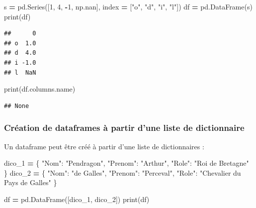 \documentclass[
  12pt,
]{book}
\newenvironment{Shaded}{\begin{snugshade}}{\end{snugshade}}
\newcommand{\BuiltInTok}[1]{#1}
\newcommand{\DecValTok}[1]{\textcolor[rgb]{0.00,0.00,0.81}{#1}}
\newcommand{\NormalTok}[1]{#1}
\newcommand{\OperatorTok}[1]{\textcolor[rgb]{0.81,0.36,0.00}{\textbf{#1}}}
\newcommand{\StringTok}[1]{\textcolor[rgb]{0.31,0.60,0.02}{#1}}
\numberwithin{equation}{section}
\numberwithin{countremarque}{section}
\begin{document}
\begin{Shaded}
\begin{Highlighting}[]
\NormalTok{s }\OperatorTok{=}\NormalTok{ pd.Series([}\DecValTok{1}\NormalTok{, }\DecValTok{4}\NormalTok{, }\OperatorTok{{-}}\DecValTok{1}\NormalTok{, np.nan], index }\OperatorTok{=}\NormalTok{ [}\StringTok{"o"}\NormalTok{, }\StringTok{"d"}\NormalTok{, }\StringTok{"i"}\NormalTok{, }\StringTok{"l"}\NormalTok{])}
\NormalTok{df }\OperatorTok{=}\NormalTok{ pd.DataFrame(s)}
\BuiltInTok{print}\NormalTok{(df)}
\end{Highlighting}
\end{Shaded}

\begin{lstlisting}
##      0
## o  1.0
## d  4.0
## i -1.0
## l  NaN
\end{lstlisting}

\begin{Shaded}
\begin{Highlighting}[]
\BuiltInTok{print}\NormalTok{(df.columns.name)}
\end{Highlighting}
\end{Shaded}

\begin{lstlisting}
## None
\end{lstlisting}

\subsubsection{Création de dataframes à partir d'une liste de dictionnaire}\label{cruxe9ation-de-dataframes-uxe0-partir-dune-liste-de-dictionnaire}

Un dataframe peut être créé à partir d'une liste de dictionnaires :

\begin{Shaded}
\begin{Highlighting}[]
\NormalTok{dico\_1 }\OperatorTok{=}\NormalTok{ \{}
    \StringTok{"Nom"}\NormalTok{: }\StringTok{"Pendragon"}\NormalTok{,}
    \StringTok{"Prenom"}\NormalTok{: }\StringTok{"Arthur"}\NormalTok{,}
    \StringTok{"Role"}\NormalTok{: }\StringTok{"Roi de Bretagne"}
\NormalTok{\}}
\NormalTok{dico\_2 }\OperatorTok{=}\NormalTok{ \{}
    \StringTok{"Nom"}\NormalTok{: }\StringTok{"de Galles"}\NormalTok{,}
    \StringTok{"Prenom"}\NormalTok{: }\StringTok{"Perceval"}\NormalTok{,}
    \StringTok{"Role"}\NormalTok{: }\StringTok{"Chevalier du Pays de Galles"}
\NormalTok{\}}

\NormalTok{df }\OperatorTok{=}\NormalTok{ pd.DataFrame([dico\_1, dico\_2])}
\BuiltInTok{print}\NormalTok{(df)}
\end{Highlighting}
\end{Shaded}
\end{document}
